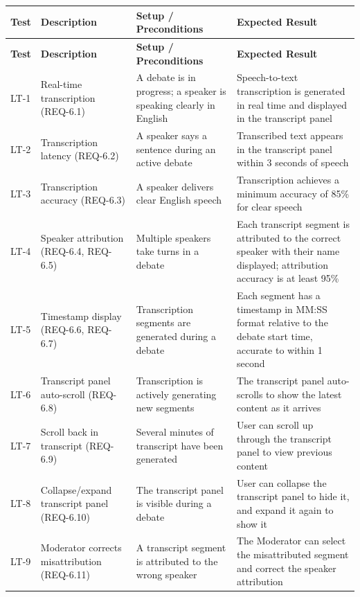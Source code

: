 \documentclass[12pt]{article}
\begin{document}
\begin{longtable}{|p{1.5cm}|p{3cm}|p{4cm}|p{4cm}|}
\hline
\textbf{Test} & \textbf{Description} & \textbf{Setup / Preconditions} & \textbf{Expected Result} \\
\hline
\endfirsthead
\hline
\textbf{Test} & \textbf{Description} & \textbf{Setup / Preconditions} & \textbf{Expected Result} \\
\hline
\endhead
LT-1 & Real-time transcription (REQ-6.1) & A debate is in progress; a speaker is speaking clearly in English & Speech-to-text transcription is generated in real time and displayed in the transcript panel \\
\hline
LT-2 & Transcription latency (REQ-6.2) & A speaker says a sentence during an active debate & Transcribed text appears in the transcript panel within 3 seconds of speech \\
\hline
LT-3 & Transcription accuracy (REQ-6.3) & A speaker delivers clear English speech & Transcription achieves a minimum accuracy of 85\% for clear speech \\
\hline
LT-4 & Speaker attribution (REQ-6.4, REQ-6.5) & Multiple speakers take turns in a debate & Each transcript segment is attributed to the correct speaker with their name displayed; attribution accuracy is at least 95\% \\
\hline
LT-5 & Timestamp display (REQ-6.6, REQ-6.7) & Transcription segments are generated during a debate & Each segment has a timestamp in MM:SS format relative to the debate start time, accurate to within 1 second \\
\hline
LT-6 & Transcript panel auto-scroll (REQ-6.8) & Transcription is actively generating new segments & The transcript panel auto-scrolls to show the latest content as it arrives \\
\hline
LT-7 & Scroll back in transcript (REQ-6.9) & Several minutes of transcript have been generated & User can scroll up through the transcript panel to view previous content \\
\hline
LT-8 & Collapse/expand transcript panel (REQ-6.10) & The transcript panel is visible during a debate & User can collapse the transcript panel to hide it, and expand it again to show it \\
\hline
LT-9 & Moderator corrects misattribution (REQ-6.11) & A transcript segment is attributed to the wrong speaker & The Moderator can select the misattributed segment and correct the speaker attribution \\
\hline
\end{longtable}
\end{document}
